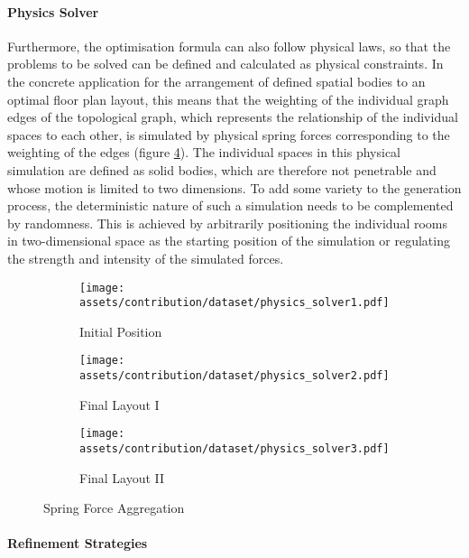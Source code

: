 \documentclass[a4paper, 12pt]{report}
\begin{document}
\paragraph{Physics Solver}\label{par:physics-solver}

Furthermore, the optimisation formula can also follow physical laws, so that the problems to be solved can be defined and calculated as physical constraints. In the concrete application for the arrangement of defined spatial bodies to an optimal floor plan layout, this means that the weighting of the individual graph edges of the topological graph, which represents the relationship of the individual spaces to each other, is simulated by physical spring forces corresponding to the weighting of the edges (figure \ref{fig:physics-solver-aggregation}). The individual spaces in this physical simulation are defined as solid bodies, which are therefore not penetrable and whose motion is limited to two dimensions. To add some variety to the generation process, the \gls{deterministic} nature of such a simulation needs to be complemented by randomness. This is achieved by arbitrarily positioning the individual rooms in two-dimensional space as the starting position of the simulation or regulating the strength and intensity of the simulated forces.

\begin{figure}
\centering
\begin{subfigure}{.33\textwidth}
\centering
\texttt{[image: assets/contribution/dataset/physics\_solver1.pdf]}
\caption{Initial Position}
\label{fig:initial-disposition-1}
\end{subfigure}%
\begin{subfigure}{.33\textwidth}
\centering
\texttt{[image: assets/contribution/dataset/physics\_solver2.pdf]}
\caption{Final Layout I}
\label{fig:final-layout-i}
\end{subfigure}%
\begin{subfigure}{.33\textwidth}
\centering
\texttt{[image: assets/contribution/dataset/physics\_solver3.pdf]}
\caption{Final Layout II}
\label{fig:final-layout-ii}
\end{subfigure}
\caption{Spring Force Aggregation}
\label{fig:physics-solver-aggregation}
\end{figure}

\paragraph{Refinement Strategies}\label{par:refinement-strategies}
\end{document}
